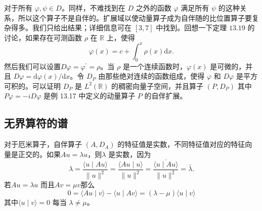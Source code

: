 \begin{eg}
对于所有 \(\varphi, \psi \in D\)。同样，不难找到在 \(D\) 之外的函数 \(\varphi\) 满足所有 \(\psi\) 的这种关系，所以这个算子不是自伴的。扩展域以使动量算子成为自伴随的比位置算子要复杂得多。我们只给出结果；详细信息可在 \([3,7]\) 中找到。回想一下定理 \(13.19\) 的讨论，如果存在可测函数 \(\rho\) 在 \(\mathbb{R}\) 上，使得
\[\varphi(x)=c+\int_{0}^{x} \rho(x) \mathrm{d} x .\]
然后我们可以设置\(D \varphi=\varphi^{\prime}=\rho\)。当 \(\rho\) 是一个连续函数时，\(\varphi(x)\) 是可微的，并且 \(D \varphi=\mathrm{d} \varphi(x) / \mathrm{d} x\)。令 \(D_{P}\) 由那些绝对连续的函数组成，使得 \(\varphi\) 和 \(D\varphi\) 是平方可积的。可以证明 \(D_{P}\) 是 \(L^{2}(\mathbb{R})\) 的稠密向量子空间，并且算子 \(\left(P, D_{P} \right)\) 其中 \(P \varphi=-i D \varphi\) 是例 13.17 中定义的动量算子 \(P\) 的自伴扩展。
\end{eg}
\subsection{无界算符的谱}
对于厄米算子，自伴算子 \(\left(A, D_{A}\right)\) 的特征值是实数，不同特征值对应的特征向量是正交的。如果\(A u=\lambda u\)，则\(\lambda\) 是实数，因为
\[
\lambda=\frac{\langle u \mid A u\rangle}{\|u\|^{2}}=\frac{\langle A u \mid u\rangle}{\|u\|^{2}}=\frac{\overline{\langle u \mid A u\rangle}}{\|u\|^{2}}=\bar{\lambda} .
\]
若\(A u=\lambda u\) 而且\(A v=\mu v\)那么
\[
0=\langle A u \mid v\rangle-\langle u \mid A v\rangle=(\lambda-\mu)\langle u \mid v\rangle
\]
其中\(\langle u \mid v\rangle=0\) 每当 \(\lambda \neq \mu\)。

